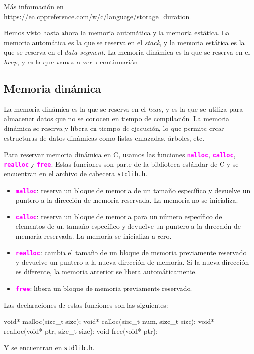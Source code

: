 \documentclass[]{scrartcl}
\newcommand{\hl}[1]{\textcolor{magenta}{\textbf{\texttt{#1}}}}
\begin{document}
Más información en \url{https://en.cppreference.com/w/c/language/storage_duration}.

Hemos visto hasta ahora la memoria automática y la memoria estática. La memoria automática es la que se reserva en el \textit{stack}, y la memoria estática es la que se reserva en el \textit{data segment}.
La memoria dinámica es la que se reserva en el \textit{heap}, y es la que vamos a ver a continuación.

\subsection*{Memoria dinámica}

La memoria dinámica es la que se reserva en el \textit{heap}, y es la que se utiliza para almacenar datos que no se conocen en tiempo de compilación. La memoria dinámica se reserva y libera en tiempo de ejecución, lo que permite crear estructuras de datos dinámicas como listas enlazadas, árboles, etc.

Para reservar memoria dinámica en C, usamos las funciones \hl{malloc}, \hl{calloc}, \hl{realloc} y \hl{free}. Estas funciones son parte de la biblioteca estándar de C y se encuentran en el archivo de cabecera \texttt{stdlib.h}.
\begin{itemize}
  \item \hl{malloc}: reserva un bloque de memoria de un tamaño específico y devuelve un puntero a la dirección de memoria reservada. La memoria no se inicializa.
  \item \hl{calloc}: reserva un bloque de memoria para un número específico de elementos de un tamaño específico y devuelve un puntero a la dirección de memoria reservada. La memoria se inicializa a cero.
  \item \hl{realloc}: cambia el tamaño de un bloque de memoria previamente reservado y devuelve un puntero a la nueva dirección de memoria. Si la nueva dirección es diferente, la memoria anterior se libera automáticamente.
  \item \hl{free}: libera un bloque de memoria previamente reservado.
\end{itemize}

Las declaraciones de estas funciones son las siguientes:
\begin{cbox}[]{}
  void* malloc(size_t size);
  void* calloc(size_t num, size_t size);
  void* realloc(void* ptr, size_t size);
  void free(void* ptr);
\end{cbox}

Y se encuentran en \texttt{stdlib.h}.
\end{document}
